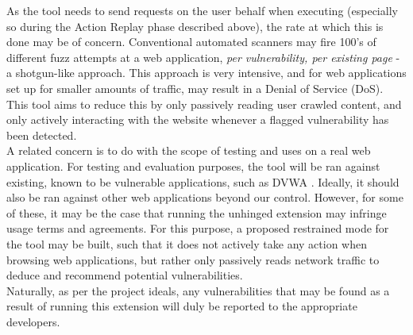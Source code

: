 As the tool needs to send requests on the user behalf when executing (especially so during the Action Replay phase described above), the rate at which this is done may be of concern. Conventional automated scanners may fire 100's of different fuzz attempts at a web application, \emph{per vulnerability, per existing page} - a shotgun-like approach. This approach is very intensive, and for web applications set up for smaller amounts of traffic, may result in a Denial of Service (DoS). This tool aims to reduce this by only passively reading user crawled content, and only actively interacting with the website whenever a flagged vulnerability has been detected. \\

A related concern is to do with the scope of testing and uses on a real web application. For testing and evaluation purposes, the tool will be ran against existing, known to be vulnerable applications, such as DVWA \cite{dvwaSite}. Ideally, it should also be ran against other web applications beyond our control. However, for some of these, it may be the case that running the unhinged extension may infringe usage terms and agreements. For this purpose, a proposed restrained mode for the tool may be built, such that it does not actively take any action when browsing web applications, but rather only passively reads network traffic to deduce and recommend potential vulnerabilities. \\

Naturally, as per the project ideals, any vulnerabilities that may be found as a result of running this extension will duly be reported to the appropriate developers.